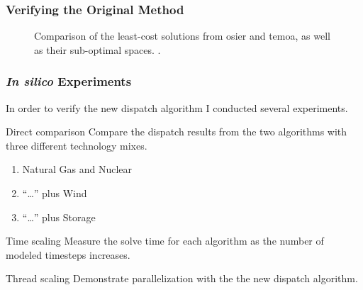 


\begin{frame}
    \frametitle{Verifying the Original Method}

    \begin{figure}
        \centering
        \resizebox{0.75\columnwidth}{!}{}
        \caption{Comparison of the least-cost solutions from \gls{osier} and
        \gls{temoa}, as well as their sub-optimal spaces.
        .}
        \label{fig:osier-temoa-benchmark}
    \end{figure}
\end{frame}

\begin{frame}
    \frametitle{\textit{In silico} Experiments}

    In order to verify the new dispatch algorithm I conducted several 
    experiments.
    \pause
    \begin{block}{Direct comparison}
        Compare the dispatch results from the two algorithms with three different technology mixes.
        \begin{enumerate}
            \item Natural Gas and Nuclear
            \item ``\dots'' plus Wind
            \item ``\dots'' plus Storage
        \end{enumerate}
    \end{block}
    \pause
    \begin{block}{Time scaling}
        Measure the solve time for each algorithm as the number of modeled timesteps increases.
    \end{block}
    \pause
    \begin{block}{Thread scaling}
        Demonstrate parallelization with the the new dispatch algorithm.
    \end{block}
\end{frame}

